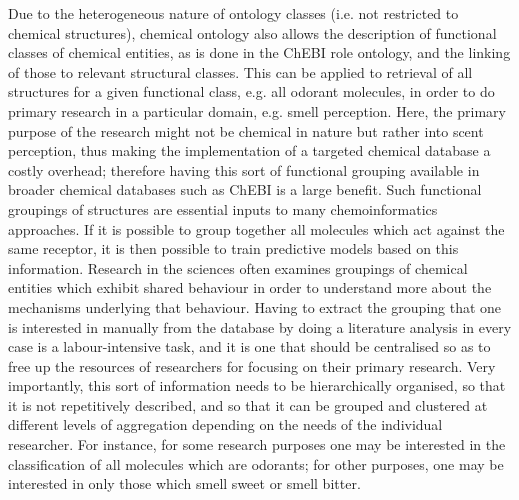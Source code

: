 \documentclass[10pt]{bmc_article}
\newenvironment{bmcformat}{\baselineskip20pt\sloppy\setboolean{publ}{false}}{\baselineskip20pt\sloppy}
\begin{document}
\begin{bmcformat}
Due to the heterogeneous nature of ontology classes (i.e. not restricted to chemical structures), chemical ontology also allows the description of functional classes of chemical entities, as is done in the ChEBI role ontology, and the linking of those to relevant structural classes.  
This can be applied to retrieval of all structures for a given functional class, e.g. all odorant molecules, in order to do primary research in a particular domain, e.g. smell perception. Here, the primary purpose of the research might not be chemical in nature but rather into scent perception, thus making the implementation of a targeted chemical database a costly overhead; therefore having this sort of functional grouping available in broader chemical databases such as ChEBI is a large benefit.
Such functional groupings of structures are essential inputs to many chemoinformatics approaches.  If it is possible to group together all molecules which act against the same receptor, it is then possible to train predictive models based on this information.   %
Research in the sciences often examines groupings of chemical entities which exhibit shared behaviour in order to understand more about the mechanisms underlying that behaviour. 
Having to extract the grouping that one is interested in manually from the database by doing a literature analysis in every case is a labour-intensive task, and it is one that should be centralised so as to free up the resources of researchers for focusing on their primary research. 
Very importantly, this sort of information needs to be hierarchically organised, so that it is not repetitively described, and so that it can be grouped and clustered at different levels of aggregation depending on the needs of the individual researcher. For instance, for some research purposes one may be interested in the classification of all molecules which are odorants; for other purposes, one may be interested in only those which smell sweet or smell bitter. 



\end{bmcformat}
\end{document}
